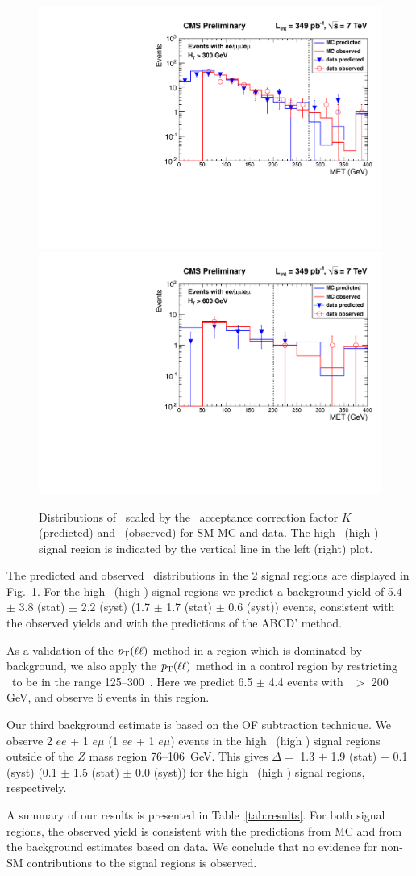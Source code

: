 \begin{figure}[hbt]
\begin{center}
\includegraphics[width=0.48\linewidth]{plots_final/victory_met275_ht300_349pb.pdf}
\includegraphics[width=0.48\linewidth]{plots_final/victory_met200_ht600_349pb.pdf}
\caption{\label{fig:victory}\protect 
Distributions of \ptll\ scaled by the \MET\ acceptance correction factor $K$ (predicted) 
and \met\ (observed) for SM MC and data. The high \MET\ (high \Ht) signal region
is indicated by the vertical line in the left (right) plot.
}
\end{center}
\end{figure}

The predicted and observed \MET\ distributions in the 2 signal regions are displayed
in Fig.~\ref{fig:victory}. For the high \MET\ (high \Ht) signal regions we predict
a background yield of 5.4 $\pm$ 3.8 (stat) $\pm$ 2.2 (syst) 
(1.7 $\pm$ 1.7 (stat) $\pm$ 0.6 (syst)) events, consistent with the observed yields
and with the predictions of the ABCD' method. 

As a validation of the $p_{\mathrm{T}}(\ell\ell)$ method in a region which is dominated by
background, we also apply the $p_{\mathrm{T}}(\ell\ell)$ method in a control region by restricting
\HT\ to be in the range 125--300~\GeV. Here we predict 6.5 $\pm$ 4.4 events with
\MET\ $>$ 200 GeV, and observe 6 events in this region.

Our third background estimate is based on the OF subtraction technique. We observe
2 $ee$ + 1 $e\mu$ (1 $ee$ + 1 $e\mu$) events in the high \MET\ (high \Ht) signal
regions outside of the $Z$ mass region 76--106~GeV. This gives 
$\Delta = $ 1.3 $\pm$ 1.9 (stat) $\pm$ 0.1 (syst) 
(0.1 $\pm$ 1.5 (stat) $\pm$ 0.0 (syst)) for the high \MET\ (high \Ht) signal regions,
respectively.

A summary of our results is presented in Table~\ref{tab:results}. For both signal regions,
the observed yield is consistent with the predictions from MC and from the background estimates
based on data. We conclude that no evidence for non-SM contributions to the signal regions
is observed.
